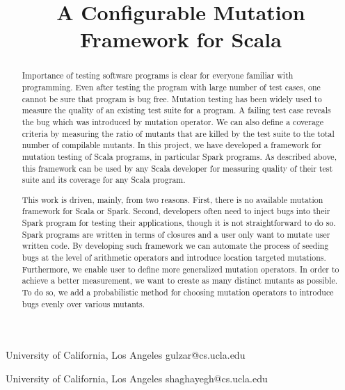\documentclass[preprint]{sigplanconf}
\begin{document}
\setlength{\pdfpageheight}{\paperheight}
\setlength{\pdfpagewidth}{\paperwidth}



\title{A Configurable Mutation Framework for Scala}

           {University of California, Los Angeles}
           {gulzar@cs.ucla.edu}

           {University of California, Los Angeles}
           {shaghayegh@cs.ucla.edu}

\maketitle

\begin{abstract}
Importance of testing software programs is clear for everyone familiar with programming. Even after testing the program with large number of test cases, one cannot be sure that program is bug free. Mutation testing has been widely used to measure the quality of an existing test suite for a program.  A failing test case reveals the bug which was introduced by mutation operator. We can also define a coverage criteria by measuring the ratio of mutants that are killed by the test suite to the total number of compilable mutants. In this project, we have developed a framework for mutation testing of Scala programs, in particular Spark programs. As described above, this framework can be used by any Scala developer for measuring quality of their test suite and its coverage for any Scala program.

This work is driven, mainly, from two reasons. First, there is no available mutation framework for Scala or Spark. Second, developers often need to inject bugs into their Spark program for testing their applications, though it is not straightforward to do so. Spark programs are written in terms of closures and a user only want to mutate user written code. By developing such framework we can automate the process of seeding bugs at the level of arithmetic operators and introduce location targeted mutations. Furthermore, we enable user to define more generalized mutation operators. In order to achieve a better measurement, we want to create as many distinct mutants as possible. To do so, we add a probabilistic method for choosing mutation operators to introduce bugs evenly over various mutants. 
\end{abstract}





\end{document}
